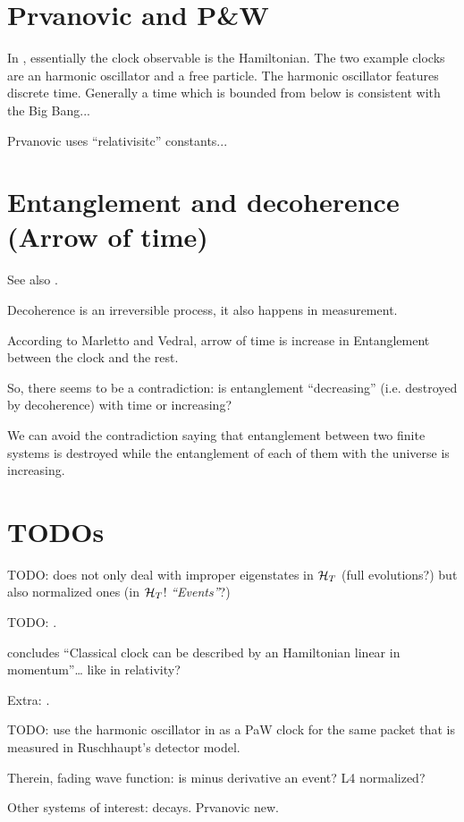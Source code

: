 
\section{Prvanovic and P\&W}
In \cite{Prvanovic}, essentially the clock observable is the Hamiltonian.
The two example clocks are an harmonic oscillator and a free particle.
The harmonic oscillator features discrete time. Generally a time which is
{bounded from below}
is consistent with the Big Bang...

Prvanovic uses ``relativisitc'' constants...

\section{Entanglement and decoherence (Arrow of time)}
See also \cite{EntanglementVsDecoherence}.

Decoherence is an irreversible process, it also happens in measurement.

According to Marletto and Vedral, arrow of time is increase in Entanglement
between the clock and the rest.

So, there seems to be a contradiction: is entanglement ``decreasing''
(i.e. destroyed by decoherence) with time
or increasing?

We can avoid the contradiction saying that
entanglement between two finite systems is
destroyed while the entanglement of each of them with the universe
is increasing.

\section{TODOs}

TODO: \cite{Lloyd:Time} does not only deal with improper eigenstates in $\mathcal{H}_T$
(full evolutions?)
but also normalized ones (in $\mathcal{H}_T$! \emph{``Events''}?)

TODO: \cite{RealisticClocks}.

\cite{HarmonicClocks} concludes ``Classical clock can be described by an Hamiltonian linear in momentum''\dots
like in relativity?

Extra: \cite{TimeAnyons}.

TODO: use the harmonic oscillator in \cite{HarmonicClocks}
as a PaW clock for the same packet that is measured in
Ruschhaupt's detector model.

Therein, fading wave function: is minus derivative an event?
L4 normalized?

Other systems of interest: decays. Prvanovic new.

